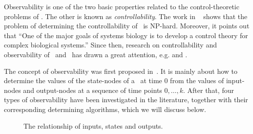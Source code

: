 Observability is one of the two basic  properties related to  the control-theoretic problems of \BCNs. The other is known as {\em controllability}. The work in ~\cite{Akutsu2007Control} shows that the problem of determining the controllability of \BCNs\ is {NP}-hard. Moreover, it  points out that ``One of the major goals of systems biology is to develop a control theory for complex biological systems.''  Since then, research on  controllability and observability of \BNs\ and \BCNs\ has drawn a great attention, e.g. \cite{cheng2009controllability, Zhao2010Input, Cheng2011Identification, Cheng2011Analysis} and \cite{Fornasini2013Observability}. %

 The concept of observability was first proposed in~\cite{cheng2009controllability}. It is mainly about how  to determine  the values of the  state-nodes  of a \BCN\  at time $0$ from the values of  input-nodes  and output-nodes at a sequence of time points $0,\ldots, k$. After that, four types of observability have been investigated in the literature,
 together with their corresponding determining algorithms, which we will discuss below.

\begin{figure}[!t]
      \centering
      
      \caption{The relationship of inputs, states and outputs.}
      \label{fig:10}
  \end{figure}

